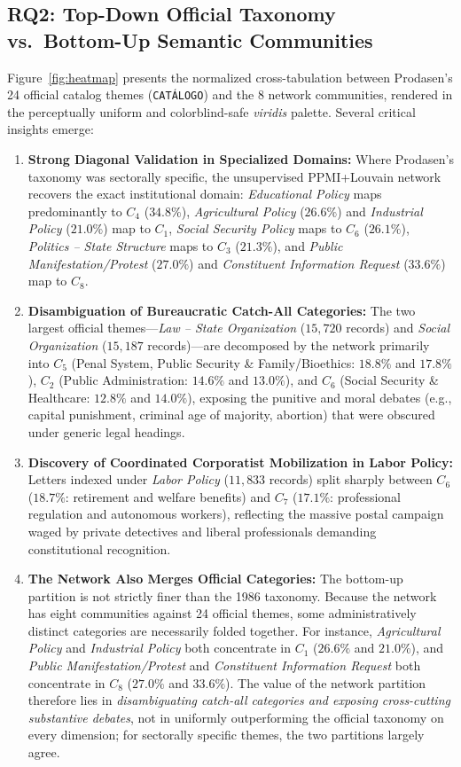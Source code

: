 \documentclass[pdflatex,sn-mathphys,iicol]{sn-jnl}
\begin{document}
\subsection{RQ2: Top-Down Official Taxonomy vs.\ Bottom-Up Semantic Communities}
Figure~\ref{fig:heatmap} presents the normalized cross-tabulation between Prodasen's 24 official catalog themes (\texttt{CAT\'{A}LOGO}) and the 8 network communities, rendered in the perceptually uniform and colorblind-safe \textit{viridis} palette. Several critical insights emerge:
\begin{enumerate}
    \item \textbf{Strong Diagonal Validation in Specialized Domains:} Where Prodasen's taxonomy was sectorally specific, the unsupervised PPMI+Louvain network recovers the exact institutional domain: \textit{Educational Policy} maps predominantly to $C_4$ ($34.8\%$), \textit{Agricultural Policy} ($26.6\%$) and \textit{Industrial Policy} ($21.0\%$) map to $C_1$, \textit{Social Security Policy} maps to $C_6$ ($26.1\%$), \textit{Politics -- State Structure} maps to $C_3$ ($21.3\%$), and \textit{Public Manifestation/Protest} ($27.0\%$) and \textit{Constituent Information Request} ($33.6\%$) map to $C_8$.
    \item \textbf{Disambiguation of Bureaucratic Catch-All Categories:} The two largest official themes---\textit{Law -- State Organization} ($15,720$ records) and \textit{Social Organization} ($15,187$ records)---are decomposed by the network primarily into $C_5$ (Penal System, Public Security \& Family/Bioethics: $18.8\%$ and $17.8\%$), $C_2$ (Public Administration: $14.6\%$ and $13.0\%$), and $C_6$ (Social Security \& Healthcare: $12.8\%$ and $14.0\%$), exposing the punitive and moral debates (e.g., capital punishment, criminal age of majority, abortion) that were obscured under generic legal headings.
    \item \textbf{Discovery of Coordinated Corporatist Mobilization in Labor Policy:} Letters indexed under \textit{Labor Policy} ($11,833$ records) split sharply between $C_6$ ($18.7\%$: retirement and welfare benefits) and $C_7$ ($17.1\%$: professional regulation and autonomous workers), reflecting the massive postal campaign waged by private detectives and liberal professionals demanding constitutional recognition.
    \item \textbf{The Network Also Merges Official Categories:} The bottom-up partition is not strictly finer than the 1986 taxonomy. Because the network has eight communities against 24 official themes, some administratively distinct categories are necessarily folded together. For instance, \textit{Agricultural Policy} and \textit{Industrial Policy} both concentrate in $C_1$ ($26.6\%$ and $21.0\%$), and \textit{Public Manifestation/Protest} and \textit{Constituent Information Request} both concentrate in $C_8$ ($27.0\%$ and $33.6\%$). The value of the network partition therefore lies in \emph{disambiguating catch-all categories and exposing cross-cutting substantive debates}, not in uniformly outperforming the official taxonomy on every dimension; for sectorally specific themes, the two partitions largely agree.
\end{enumerate}
\end{document}

